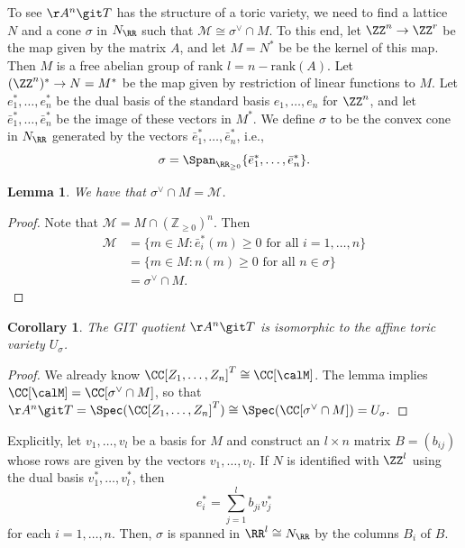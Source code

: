 \documentclass[12pt]{amsart}
\theoremstyle{plain}
\newtheorem{corollary}[theorem]{Corollary}
\newtheorem{lemma}[theorem]{Lemma}
\begin{document}
To see $\AA^n \git T$ has the structure of a toric variety, we need to find a lattice $N$ and a cone $\sigma$ in $N_\RR$ such that $\mathcal{M} \cong \sigma^\vee \cap M$.
To this end, let $\ZZ^n \to \ZZ^r$ be the map given by the matrix $A$, and let $M = N^*$ be be the kernel of this map.
Then $M$ is a free abelian group of rank $l = n - \mathrm{rank}(A)$.
Let $(\ZZ^n)^* \to N = M^*$ be the map given by restriction of linear functions to $M$.
Let $e_1^*, \ldots, e_n^*$ be the dual basis of the standard basis $e_1, \ldots, e_n$ for $\ZZ^n$, and let $\bar{e}_1^*, \ldots, \bar{e}_n^*$ be the image of these vectors in $M^*$.
We define $\sigma$ to be the convex cone in $N_\RR$ generated by the vectors $\bar{e}_1^*, \ldots, \bar{e}_n^*$, i.e.,
$$\sigma = \Span_{\RR_{\ge 0}}\{ \bar{e}_1^* , \ldots, \bar{e}_n^*\}.$$

\begin{lemma}
We have that $\sigma^\vee \cap M = \mathcal{M}$.
\end{lemma}
\begin{proof}
Note that $\mathcal{M} = M \cap (\mathbb{Z}_{\ge 0})^n$.
Then
\begin{align*}
	\mathcal{M} &= \{m \in M : \bar{e}_i^*(m) \ge 0 \text{ for all } i = 1, \ldots, n\} \\
			&= \{m \in M : n(m) \ge 0 \text{ for all } n \in \sigma\} \\
			&= \sigma^\vee \cap M.
\end{align*}
\end{proof}

\begin{corollary}
The GIT quotient $\AA^n \git T$ is isomorphic to the affine toric variety $U_\sigma$.
\end{corollary}
\begin{proof}
We already know $\CC[Z_1, \ldots, Z_n]^T \cong \CC[\calM]$.
The lemma implies $\CC[\calM] = \CC[\sigma^\vee \cap M]$, so that $\AA^n \git T = \Spec(\CC[Z_1, \ldots, Z_n]^T) \cong \Spec(\CC[\sigma^\vee \cap M]) = U_\sigma.$ 
\end{proof}

Explicitly, let $v_1, \ldots, v_l$ be a basis for $M$ and construct an $l \times n$ matrix $B=(b_{ij})$ whose rows are given by the vectors $v_1, \ldots, v_l$.
If $N$ is identified with $\ZZ^l$ using the dual basis $v_1^*, \ldots, v_l^*$, then
$$e_i^* = \sum_{j=1}^l b_{ji} v_j^*$$
for each $i=1, \ldots, n.$
Then, $\sigma$ is spanned in $\RR^l \cong N_\RR$ by the columns $B_i$ of $B$. 
\end{document}
